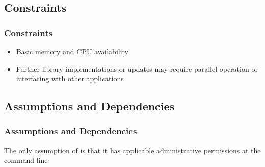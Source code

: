 
\subsection{Constraints}

\begin{frame}
\frametitle{Constraints}
\begin{itemize}
\item Basic memory and CPU availability
\item Further library implementations or updates may require parallel operation or interfacing with other applications
\end{itemize}
\end{frame}


\subsection{Assumptions and Dependencies}

\begin{frame}
\frametitle{Assumptions and Dependencies}
The only assumption of \cry{} is that it has applicable
administrative permissions at the command line
\end{frame}

